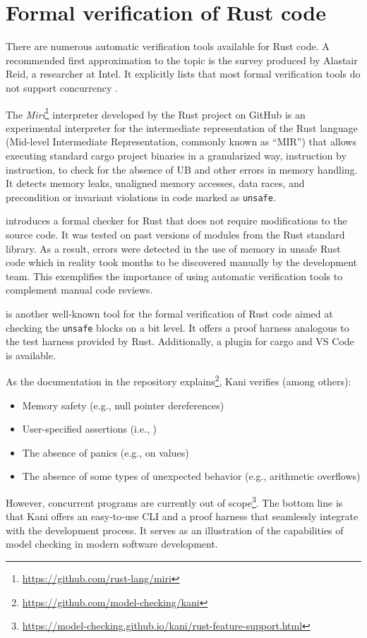 \section{Formal verification of Rust code}

There are numerous automatic verification tools available for Rust code.
A recommended first approximation to the topic is
the survey produced by Alastair Reid, a researcher at Intel.
It explicitly lists that most formal verification tools
do not support concurrency \cite{reid2021}.

The \emph{Miri}\footnote{\url{https://github.com/rust-lang/miri}} interpreter
developed by the Rust project on GitHub is an experimental interpreter
for the intermediate representation of the Rust language
(Mid-level Intermediate Representation, commonly known as ``\acrshort{MIR}'')
that allows executing standard cargo project binaries
in a granularized way, instruction by instruction,
to check for the absence of \acrfull{UB}
and other errors in memory handling.
It detects memory leaks, unaligned memory accesses, data races,
and precondition or invariant violations in code marked as \texttt{unsafe}.

\cite{toman2015crust} introduces a formal checker for Rust
that does not require modifications to the source code.
It was tested on past versions of modules from the Rust standard library.
As a result, errors were detected in the use of memory in unsafe Rust code
which in reality took months to be discovered manually by the development team.
This exemplifies the importance of using automatic verification tools
to complement manual code reviews.

\cite{kani2023} is another well-known tool for the formal verification of Rust code
aimed at checking the \texttt{unsafe} blocks on a bit level.
It offers a proof harness analogous to the test harness provided by Rust.
Additionally, a plugin for cargo and VS Code is available.

As the documentation in the repository explains\footnote{\url{https://github.com/model-checking/kani}}, Kani verifies (among others):

\begin{itemize}
  \item Memory safety (e.g., null pointer dereferences)
  \item User-specified assertions (i.e., )
  \item The absence of panics (e.g.,  on  values)
  \item The absence of some types of unexpected behavior (e.g., arithmetic overflows)
\end{itemize}

However, concurrent programs are currently out of scope\footnote{\url{https://model-checking.github.io/kani/rust-feature-support.html}}.
The bottom line is that Kani offers an easy-to-use \acrshort{CLI} and a proof harness
that seamlessly integrate with the development process.
It serves as an illustration of the capabilities of model checking in modern software development.
